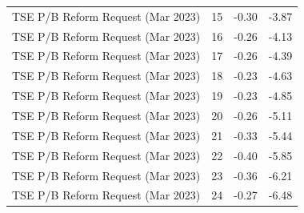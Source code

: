 \begin{table}
\begin{tabular}{lrrr}
TSE P/B Reform Request (Mar 2023) & 15 & -0.30 & -3.87 \\
TSE P/B Reform Request (Mar 2023) & 16 & -0.26 & -4.13 \\
TSE P/B Reform Request (Mar 2023) & 17 & -0.26 & -4.39 \\
TSE P/B Reform Request (Mar 2023) & 18 & -0.23 & -4.63 \\
TSE P/B Reform Request (Mar 2023) & 19 & -0.23 & -4.85 \\
TSE P/B Reform Request (Mar 2023) & 20 & -0.26 & -5.11 \\
TSE P/B Reform Request (Mar 2023) & 21 & -0.33 & -5.44 \\
TSE P/B Reform Request (Mar 2023) & 22 & -0.40 & -5.85 \\
TSE P/B Reform Request (Mar 2023) & 23 & -0.36 & -6.21 \\
TSE P/B Reform Request (Mar 2023) & 24 & -0.27 & -6.48 \\
\bottomrule
\end{tabular}
\end{table}
